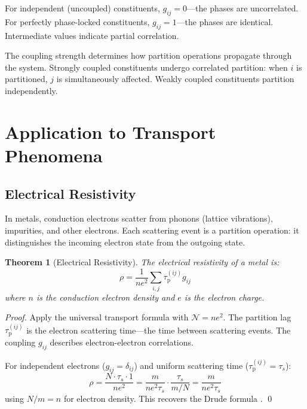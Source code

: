 \documentclass[twocolumn,10pt,aps,prd,superscriptaddress,nofootinbib]{revtex4-2}
\newtheorem{theorem}{Theorem}[section]
\theoremstyle{remark}
\newcommand{\tauP}{\tau_{\mathrm{p}}}
\newcommand{\Gij}{g_{ij}}
\newcommand{\Norm}{\mathcal{N}}
\begin{document}
For independent (uncoupled) constituents, $\Gij = 0$---the phases are uncorrelated. For perfectly phase-locked constituents, $\Gij = 1$---the phases are identical. Intermediate values indicate partial correlation.

The coupling strength determines how partition operations propagate through the system. Strongly coupled constituents undergo correlated partition: when $i$ is partitioned, $j$ is simultaneously affected. Weakly coupled constituents partition independently.


\section{Application to Transport Phenomena}
\label{sec:transport}

\subsection{Electrical Resistivity}

In metals, conduction electrons scatter from phonons (lattice vibrations), impurities, and other electrons. Each scattering event is a partition operation: it distinguishes the incoming electron state from the outgoing state.

\begin{theorem}[Electrical Resistivity]
\label{thm:resistivity}
The electrical resistivity of a metal is:
\begin{equation}
\rho = \frac{1}{ne^2} \sum_{i,j} \tauP^{(ij)} \Gij
\label{eq:resistivity}
\end{equation}
where $n$ is the conduction electron density and $e$ is the electron charge.
\end{theorem}

\begin{proof}
Apply the universal transport formula with $\Norm = ne^2$. The partition lag $\tauP^{(ij)}$ is the electron scattering time---the time between scattering events. The coupling $\Gij$ describes electron-electron correlations.

For independent electrons ($\Gij = \delta_{ij}$) and uniform scattering time ($\tauP^{(ij)} = \tau_s$):
\begin{equation}
\rho = \frac{N \cdot \tau_s \cdot 1}{ne^2} = \frac{m}{ne^2\tau_s} \cdot \frac{\tau_s}{m/N} = \frac{m}{ne^2\tau_s}
\end{equation}
using $N/m = n$ for electron density. This recovers the Drude formula \cite{drude1900a,drude1900b}. \qed
\end{proof}
\end{document}
